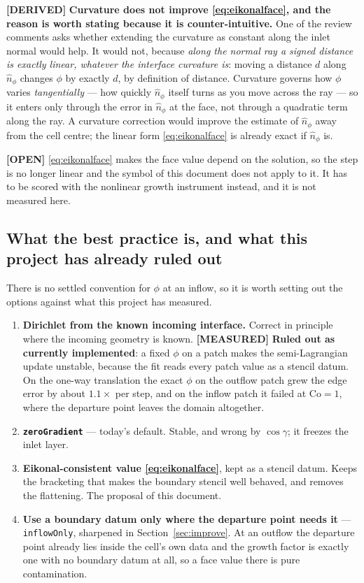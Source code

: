 \documentclass[11pt,a4paper]{article}
\newcommand{\derived}{\textcolor{blue!50!black}{\textbf{[DERIVED]}}}
\newcommand{\measured}{\textcolor{green!35!black}{\textbf{[MEASURED]}}}
\newcommand{\opn}{\textcolor{orange!80!black}{\textbf{[OPEN]}}}
\begin{document}
\derived{} \textbf{Curvature does not improve \eqref{eq:eikonalface}, and the reason is worth
stating because it is counter-intuitive.} One of the review comments asks whether extending the
curvature as constant along the inlet normal would help. It would not, because \emph{along the
normal ray a signed distance is exactly linear, whatever the interface curvature is}: moving a
distance \(d\) along \(\hat n_\phi\) changes \(\phi\) by exactly \(d\), by definition of
distance. Curvature governs how \(\phi\) varies \emph{tangentially} --- how quickly
\(\hat n_\phi\) itself turns as you move across the ray --- so it enters only through the error
in \(\hat n_\phi\) at the face, not through a quadratic term along the ray. A curvature
correction would improve the estimate of \(\hat n_\phi\) away from the cell centre; the linear
form \eqref{eq:eikonalface} is already exact if \(\hat n_\phi\) is.

\opn{} \eqref{eq:eikonalface} makes the face value depend on the solution, so the step is no
longer linear and the symbol of this document does not apply to it. It has to be scored with
the nonlinear growth instrument instead, and it is not measured here.

\subsection{What the best practice is, and what this project has already ruled out}

There is no settled convention for \(\phi\) at an inflow, so it is worth setting out the
options against what this project has measured.

\begin{enumerate}
\item \textbf{Dirichlet from the known incoming interface.} Correct in principle where the
      incoming geometry is known. \measured{} \textbf{Ruled out as currently implemented}: a
      fixed \(\phi\) on a patch makes the semi-Lagrangian update unstable, because the fit reads
      every patch value as a stencil datum. On the one-way translation the exact \(\phi\) on the
      outflow patch grew the edge error by about \(1.1\times\) per step, and on the inflow patch
      it failed at \(\mathrm{Co} = 1\), where the departure point leaves the domain altogether.
\item \textbf{\texttt{zeroGradient}} --- today's default. Stable, and wrong by \(\cos\gamma\);
      it freezes the inlet layer.
\item \textbf{Eikonal-consistent value \eqref{eq:eikonalface}}, kept as a stencil datum. Keeps
      the bracketing that makes the boundary stencil well behaved, and removes the flattening.
      The proposal of this document.
\item \textbf{Use a boundary datum only where the departure point needs it} ---
      \texttt{inflowOnly}, sharpened in Section~\ref{sec:improve}. At an outflow the departure
      point already lies inside the cell's own data and the growth factor is exactly one with no
      boundary datum at all, so a face value there is pure contamination.
\end{enumerate}
\end{document}
